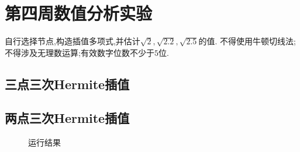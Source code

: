 \section{第四周数值分析实验}
\begin{ex}
	自行选择节点,构造插值多项式,并估计$\sqrt{2},\sqrt{2.2},\sqrt{2.5}$的值.
		不得使用牛顿切线法;不得涉及无理数运算;有效数字位数不少于$5$位.
\end{ex}
\subsection{三点三次Hermite插值}

\qa [1.4142, 1.4832, 1.5811]
\subsection{两点三次Hermite插值}

\qa [1.4142, 1.4833, 1.5811]
\begin{figure}[H]
	\centering
	\hfill
	\caption{运行结果}
	\label{fig:day4}
\end{figure}

